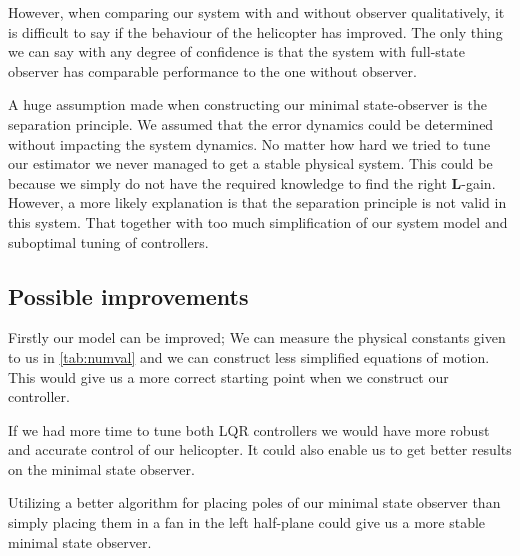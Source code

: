 However, when comparing our system with and without observer qualitatively, it is difficult to say if the behaviour of the helicopter has improved. The only thing we can say with any degree of confidence is that the system with full-state observer has comparable performance to the one without observer.

A huge assumption made when constructing our minimal state-observer is the separation principle\cite{Chen2014}. We assumed that the error dynamics could be determined without impacting the system dynamics. No matter how hard we tried to tune our estimator we never managed to get a stable physical system. This could be because we simply do not have the required knowledge to find the right $\mathbf{L}$-gain. However, a more likely explanation is that the separation principle is not valid in this system. That together with too much simplification of our system model and suboptimal tuning of controllers.

\subsection{Possible improvements}
Firstly our model can be improved; We can measure the physical constants given to us in \cref{tab:numval} and we can construct less simplified equations of motion. This would give us a more correct starting point when we construct our controller.

If we had more time to tune both LQR controllers we would have more robust and accurate control of our helicopter. It could also enable us to get better results on the minimal state observer.

Utilizing a better algorithm for placing poles of our minimal state observer than simply placing them in a fan in the left half-plane could give us a more stable minimal state observer.
